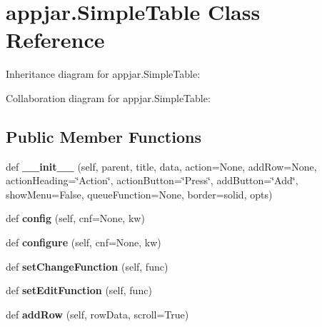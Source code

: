 \hypertarget{classappjar_1_1_simple_table}{}\section{appjar.\+Simple\+Table Class Reference}
\label{classappjar_1_1_simple_table}


Inheritance diagram for appjar.\+Simple\+Table\+:


Collaboration diagram for appjar.\+Simple\+Table\+:
\subsection*{Public Member Functions}
\begin{DoxyCompactItemize}
\item 
\mbox{\label{classappjar_1_1_simple_table_aa282f030e0b92907c45c9c958236124c}} 
def {\bfseries \+\_\+\+\_\+init\+\_\+\+\_\+} (self, parent, title, data, action=None, add\+Row=None, action\+Heading=\char`\"{}Action\char`\"{}, action\+Button=\char`\"{}Press\char`\"{}, add\+Button=\char`\"{}Add\char`\"{}, show\+Menu=False, queue\+Function=None, border=\textquotesingle{}solid\textquotesingle{}, opts)
\item 
\mbox{\label{classappjar_1_1_simple_table_ad9adaab8bf976f7bd0c449b9de4dd1ad}} 
def {\bfseries config} (self, cnf=None, kw)
\item 
\mbox{\label{classappjar_1_1_simple_table_abbefa4eb0f4e6370282cd7d61e364027}} 
def {\bfseries configure} (self, cnf=None, kw)
\item 
\mbox{\label{classappjar_1_1_simple_table_aebc2bfa97f268362c7d7e46956660d4e}} 
def {\bfseries set\+Change\+Function} (self, func)
\item 
\mbox{\label{classappjar_1_1_simple_table_a4420afad4a89611f72ed3c368c20a386}} 
def {\bfseries set\+Edit\+Function} (self, func)
\item 
\mbox{\label{classappjar_1_1_simple_table_ac51d4adf6b3c059a4b71b79c6a3056a1}} 
def {\bfseries add\+Row} (self, row\+Data, scroll=True)
\item 

\end{DoxyCompactItemize}
